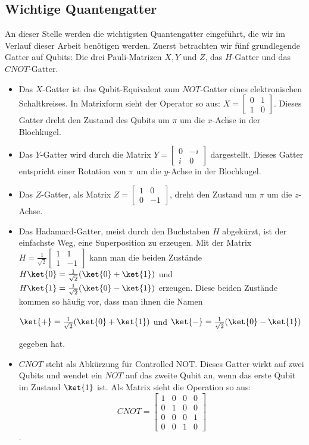 \subsection{Wichtige Quantengatter}
An dieser Stelle werden die wichtigsten Quantengatter eingeführt, die wir im Verlauf dieser Arbeit benötigen werden. Zuerst betrachten wir fünf grundlegende Gatter auf Qubits: Die drei Pauli-Matrizen $X, Y$ und $Z$, das $H$-Gatter und das $CNOT$-Gatter.
\begin{itemize}
    \item Das $X$-Gatter ist das Qubit-Equivalent zum $NOT$-Gatter eines elektronischen Schaltkreises. In Matrixform sieht der Operator so aus: $ X = \begin{bmatrix}0 & 1 \\ 1 & 0\end{bmatrix}$. Dieses Gatter dreht den Zustand des Qubits um $\pi$ um die $x$-Achse in der Blochkugel.
    \item Das $Y$-Gatter wird durch die Matrix $Y = \begin{bmatrix}0 & -i \\ i & 0\end{bmatrix}$ dargestellt. Dieses Gatter entspricht einer Rotation von $\pi$ um die $y$-Achse in der Blochkugel.
    \item Das $Z$-Gatter, als Matrix $Z = \begin{bmatrix}1 & 0 \\ 0 & -1\end{bmatrix}$, dreht den Zustand um $\pi$ um die $z$-Achse.
    \item Das Hadamard-Gatter, meist durch den Buchstaben $H$ abgekürzt, ist der einfachste Weg, eine Superposition zu erzeugen. Mit der Matrix $H = \frac{1}{\sqrt{2}}\begin{bmatrix}1 & 1 \\ 1 & -1\end{bmatrix}$ kann man die beiden Zustände $H\ket{0} = \frac{1}{\sqrt{2}}(\ket{0} + \ket{1})$ und $H\ket{1} = \frac{1}{\sqrt{2}}(\ket{0} - \ket{1})$ erzeugen. Diese beiden Zustände kommen so häufig vor, dass man ihnen die Namen \vspace{0.2cm}
    
    \centerline{\quad $\ket{+} = \frac{1}{\sqrt{2}}(\ket{0} + \ket{1})$ \quad und \quad $\ket{-} = \frac{1}{\sqrt{2}}(\ket{0} - \ket{1})$ \quad}
    
    gegeben hat.
    \item $CNOT$ steht als Abkürzung für \grqq Controlled NOT\grqq. Dieses Gatter wirkt auf zwei Qubits und wendet ein $NOT$ auf das zweite Qubit an, wenn das erste Qubit im Zustand $\ket{1}$ ist. Als Matrix sieht die Operation so aus: $$CNOT = \begin{bmatrix}1 & 0 & 0 & 0 \\ 0 & 1 & 0 & 0 \\ 0 & 0 & 0 & 1 \\ 0 & 0 & 1 & 0\end{bmatrix}$$.
\end{itemize}
